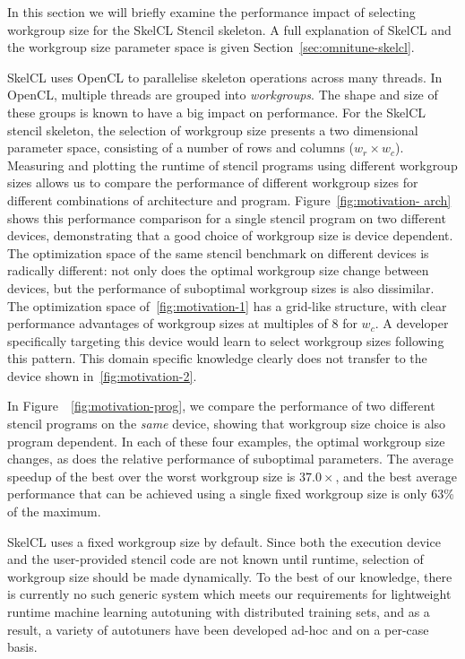 \documentclass[nonatbib,preprint,nocopyrightspace,9pt]{sigplanconf}
\begin{document}
  In this section we will briefly examine the performance impact of selecting
  workgroup size for the SkelCL Stencil skeleton. A full explanation of SkelCL and
  the workgroup size parameter space is given Section~\ref{sec:omnitune-skelcl}.

  SkelCL uses OpenCL to parallelise skeleton operations across many threads. In
  OpenCL, multiple threads are grouped into \emph{workgroups}. The shape and size
  of these groups is known to have a big impact on performance. For the SkelCL
  stencil skeleton, the selection of workgroup size presents a two dimensional
  parameter space, consisting of a number of rows and columns ($w_r \times w_c$).
  Measuring and plotting the runtime of stencil programs using different workgroup
  sizes allows us to compare the performance of different workgroup sizes for
  different combinations of architecture and program. Figure~\ref{fig:motivation-
  arch} shows this performance comparison for a single stencil program on two
  different devices, demonstrating that a good choice of workgroup size is device
  dependent. The optimization space of the same stencil benchmark on different
  devices is radically different: not only does the optimal workgroup size change
  between devices, but the performance of suboptimal workgroup sizes is also
  dissimilar. The optimization space of~\ref{fig:motivation-1} has a grid-like
  structure, with clear performance advantages of workgroup sizes at multiples of
  8 for $w_c$. A developer specifically targeting this device would learn to
  select workgroup sizes following this pattern. This domain specific knowledge
  clearly does not transfer to the device shown in~\ref{fig:motivation-2}.

  In Figure~~\ref{fig:motivation-prog}, we compare the performance of two
  different stencil programs on the \emph{same} device, showing that workgroup
  size choice is also program dependent. In each of these four examples, the
  optimal workgroup size changes, as does the relative performance of suboptimal
  parameters. The average speedup of the best over the worst workgroup size is
  $37.0\times$, and the best average performance that can be achieved using a
  single fixed workgroup size is only 63\% of the maximum.

  SkelCL uses a fixed workgroup size by default. Since both the execution device
  and the user-provided stencil code are not known until runtime, selection of
  workgroup size should be made dynamically. To the best of our knowledge, there
  is currently no such generic system which meets our requirements for lightweight
  runtime machine learning autotuning with distributed training sets, and as a
  result, a variety of autotuners have been developed ad-hoc and on a per-case
  basis.
\end{document}
